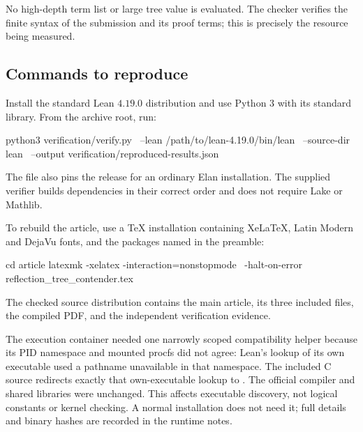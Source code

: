 No high-depth term list or large tree value is evaluated.
The checker verifies the finite syntax of the submission and
its proof terms; this is precisely the resource being measured.

\subsection{Commands to reproduce}
Install the standard Lean \(4.19.0\) distribution and use
Python \(3\) with its standard library. From the archive root,
run:
\begin{LeanCode}
python3 verification/verify.py \
  --lean /path/to/lean-4.19.0/bin/lean \
  --source-dir lean \
  --output verification/reproduced-results.json
\end{LeanCode}
The  file also pins the release for an
ordinary Elan installation. The supplied verifier builds
dependencies in their correct order and does not require Lake
or Mathlib.

To rebuild the article, use a TeX installation containing
XeLaTeX, Latin Modern and DejaVu fonts, and the packages named
in the preamble:
\begin{LeanCode}
cd article
latexmk -xelatex -interaction=nonstopmode \
  -halt-on-error reflection_tree_contender.tex
\end{LeanCode}
The checked source distribution contains the main article,
its three included \code{.tex} files, the compiled PDF,
and the independent verification evidence.

The execution container needed one narrowly scoped compatibility
helper because its PID namespace and mounted procfs did not agree:
Lean's lookup of its own executable used a pathname unavailable
in that namespace. The included C source redirects exactly that
own-executable lookup to \code{/proc/self/exe}. The official
compiler and shared libraries were unchanged. This affects
executable discovery, not logical constants or kernel checking.
A normal installation does not need it; full details and binary
hashes are recorded in the runtime notes.


